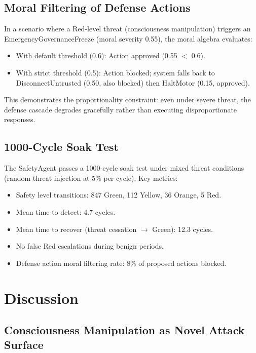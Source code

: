 \documentclass[11pt,a4paper]{article}
\begin{document}
\subsection{Moral Filtering of Defense Actions}

In a scenario where a Red-level threat (consciousness manipulation) triggers an EmergencyGovernanceFreeze (moral severity 0.55), the moral algebra evaluates:

\begin{itemize}
  \item With default threshold (0.6): Action approved (0.55 $<$ 0.6).
  \item With strict threshold (0.5): Action blocked; system falls back to DisconnectUntrusted (0.50, also blocked) then HaltMotor (0.15, approved).
\end{itemize}

This demonstrates the proportionality constraint: even under severe threat, the defense cascade degrades gracefully rather than executing disproportionate responses.

\subsection{1000-Cycle Soak Test}

The SafetyAgent passes a 1000-cycle soak test under mixed threat conditions (random threat injection at 5\% per cycle). Key metrics:

\begin{itemize}
  \item Safety level transitions: 847 Green, 112 Yellow, 36 Orange, 5 Red.
  \item Mean time to detect: 4.7 cycles.
  \item Mean time to recover (threat cessation $\to$ Green): 12.3 cycles.
  \item No false Red escalations during benign periods.
  \item Defense action moral filtering rate: 8\% of proposed actions blocked.
\end{itemize}

\section{Discussion}

\subsection{Consciousness Manipulation as Novel Attack Surface}
\end{document}
